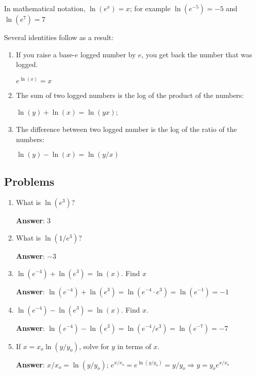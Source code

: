 \documentclass{article}
\begin{document}
In mathematical notation, $\ln(e^x) = x$; for example $\ln(e^{-5}) = -5$ and $\ln(e^7) = 7$

Several identities follow as a result:

\begin{enumerate}

  \item If you raise a base-$e$ logged number by $e$, you get back the number that was logged.

        $e^{\ln(x)} = x$

  \item The sum of two logged numbers is the log of the product of the numbers:

        $\ln(y) + \ln(x) = \ln(yx)$;

  \item The difference between two logged number is the log of the ratio of the numbers:

        $\ln(y) - \ln(x) = \ln(y/x)$

\end{enumerate}

\subsection{Problems}

\begin{enumerate}

  \item What is $\ln(e^3)$?

        \ifsolutions
        \textbf{Answer}: $3$
        \else
        \vskip 24pt
        \fi

  \item What is $\ln(1/e^3)$?

        \ifsolutions
        \textbf{Answer}: $-3$
        \else
        \vskip 24pt
        \fi

  \item $\ln(e^{-4})+\ln(e^{3}) = \ln(x)$. Find $x$

        \ifsolutions
        \textbf{Answer}: $\ln(e^{-4})+\ln(e^{3})=\ln(e^{-4}\cdot e^{3})=\ln(e^{-1})=-1$
        \else
        \vskip 24pt
        \fi

  \item $\ln(e^{-4})-\ln(e^{3}) = \ln(x)$. Find $x$.

        \ifsolutions
        \textbf{Answer}: $\ln(e^{-4})-\ln(e^{3})=\ln(e^{-4}/e^{3})=\ln(e^{-7})=-7$
        \else
        \vskip 24pt
        \fi

  \item If $x = x_o\ln(y/y_o)$, solve for $y$ in terms of $x$.

        \ifsolutions
        \textbf{Answer}: $x/x_o = \ln(y/y_o)$; $e^{x/x_o} = e^{\ln(y/y_o)}=y/y_o \Rightarrow y = y_oe^{x/x_o}$
        \else
        \vskip 24pt
        \fi

\end{enumerate}
\end{document}
